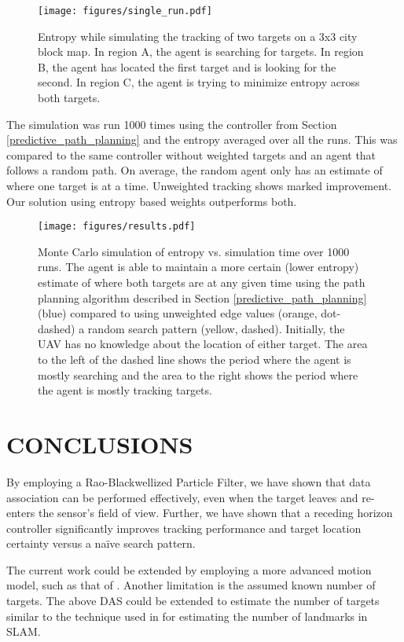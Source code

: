 \documentclass[letterpaper, 10 pt, conference]{ieeeconf}  %
\begin{document}
\begin{figure}
\texttt{[image: figures/single\_run.pdf]}
\caption{Entropy while simulating the tracking of two targets on a 3x3 city block map. In region A, the agent is searching for targets. In region B, the agent has located the first target and is looking for the second. In region C, the agent is trying to minimize entropy across both targets.}
\label{fig:single_run}
\end{figure}

The simulation was run 1000 times using the controller from Section \ref{predictive_path_planning} and the entropy averaged over all the runs. This was compared to the same controller without weighted targets and an agent that follows a random path. On average, the random agent only has an estimate of where one target is at a time. Unweighted tracking shows marked improvement. Our solution using entropy based weights outperforms both.

\begin{figure}
\texttt{[image: figures/results.pdf]}
\caption{Monte Carlo simulation of entropy vs. simulation time over 1000 runs. The agent is able to maintain a more certain (lower entropy) estimate of where both targets are at any given time using the path planning algorithm described in Section \ref{predictive_path_planning} (blue) compared to using unweighted edge values (orange, dot-dashed) a random search pattern (yellow, dashed). Initially, the UAV has no knowledge about the location of either target. The area to the left of the dashed line shows the period where the agent is mostly searching and the area to the right shows the period where the agent is mostly tracking targets.}
\label{fig:results}
\end{figure}

\section{CONCLUSIONS}\label{conclusions}

By employing a Rao-Blackwellized Particle Filter, we have shown that data association can be performed effectively, even when the target leaves and re-enters the sensor's field of view. Further, we have shown that a receding horizon controller significantly improves tracking performance and target location certainty versus a na\"{i}ve search pattern.

The current work could be extended by employing a more advanced motion model, such as that of \cite{Cheng2007}. Another limitation is the assumed known number of targets. The above DAS could be extended to estimate the number of targets similar to the technique used in \cite{Thrun2006} for estimating the number of landmarks in SLAM.
\end{document}
